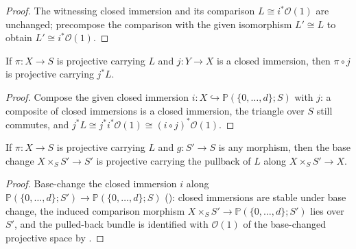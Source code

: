 \begin{proof}
  \leanok
  The witnessing closed immersion and its comparison
  \(L \cong i^* \mathcal{O}(1)\) are unchanged; precompose the comparison with
  the given isomorphism \(L' \cong L\) to obtain \(L' \cong i^*
  \mathcal{O}(1)\).
\end{proof}

\begin{lemma}
  \label{lem:projective_with_closed_immersion}
  \leanok
  If \(\pi : X \to S\) is projective carrying \(L\) and \(j : Y \to X\) is a
  closed immersion, then \(\pi \circ j\) is projective carrying \(j^* L\).
\end{lemma}

\begin{proof}
  \leanok
  Compose the given closed immersion \(i : X \hookrightarrow
  \mathbb{P}(\{0,\dots,d\}; S)\) with \(j\): a composite of closed
  immersions is a closed immersion, the triangle over \(S\) still commutes,
  and \(j^* L \cong j^* i^* \mathcal{O}(1) \cong (i \circ j)^*
  \mathcal{O}(1)\).
\end{proof}

\begin{lemma}
  \label{lem:projective_with_base_change}
  \leanok
  If \(\pi : X \to S\) is projective carrying \(L\) and \(g : S' \to S\) is
  any morphism, then the base change \(X \times_S S' \to S'\) is projective
  carrying the pullback of \(L\) along \(X \times_S S' \to X\).
\end{lemma}

\begin{proof}
  \leanok
  Base-change the closed immersion \(i\) along
  \(\mathbb{P}(\{0,\dots,d\}; S') \to \mathbb{P}(\{0,\dots,d\}; S)\)
  (): closed immersions are stable
  under base change, the induced comparison morphism
  \(X \times_S S' \to \mathbb{P}(\{0,\dots,d\}; S')\) lies over \(S'\), and
  the pulled-back bundle is identified with \(\mathcal{O}(1)\) of the
  base-changed projective space by .
\end{proof}

